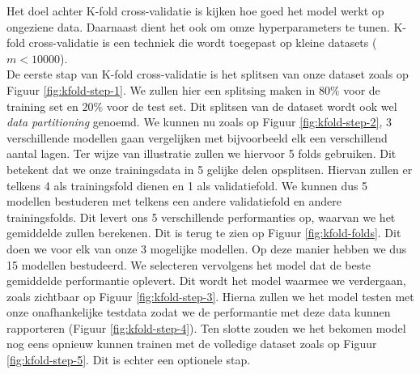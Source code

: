 Het doel achter K-fold cross-validatie is kijken hoe goed het model werkt op ongeziene data. Daarnaast dient het ook om omze hyperparameters te tunen. K-fold cross-validatie is een techniek die wordt toegepast op kleine datasets ($m < 10 000$). \\
\newline
De eerste stap van K-fold cross-validatie is het splitsen van onze dataset zoals op Figuur \ref{fig:kfold-step-1}. We zullen hier een splitsing maken in 80$\%$ voor de training set en 20$\%$ voor de test set. Dit splitsen van de dataset wordt ook wel \textit{data partitioning} genoemd. We kunnen nu zoals op Figuur \ref{fig:kfold-step-2}, 3 verschillende modellen gaan vergelijken met bijvoorbeeld elk een verschillend aantal lagen. Ter wijze van illustratie zullen we hiervoor 5 folds gebruiken. Dit betekent dat we onze trainingsdata in 5 gelijke delen opsplitsen. Hiervan zullen er telkens 4 als trainingsfold dienen en 1 als validatiefold. We kunnen dus 5 modellen bestuderen met telkens een andere validatiefold en andere trainingsfolds. Dit levert ons 5 verschillende performanties op, waarvan we het gemiddelde zullen berekenen. Dit is terug te zien op Figuur \ref{fig:kfold-folds}. Dit doen we voor elk van onze 3 mogelijke modellen. Op deze manier hebben we dus 15 modellen bestudeerd. We selecteren vervolgens het model dat de beste gemiddelde performantie oplevert. Dit wordt het model waarmee we verdergaan, zoals zichtbaar op Figuur \ref{fig:kfold-step-3}. Hierna zullen we het model testen met onze onafhankelijke testdata zodat we de performantie met deze data kunnen rapporteren (Figuur \ref{fig:kfold-step-4}). Ten slotte zouden we het bekomen model nog eens opnieuw kunnen trainen met de volledige dataset zoals op Figuur \ref{fig:kfold-step-5}. Dit is echter een optionele stap.
\newpage
